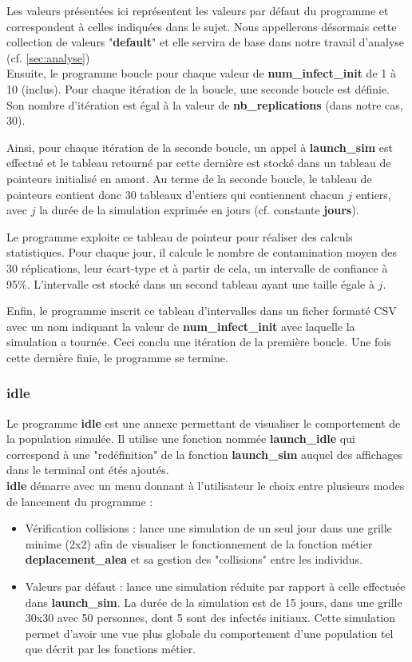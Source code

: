 \documentclass[12pt,french,titlepage]{article}
\begin{document}
Les valeurs présentées ici représentent les valeurs par défaut du programme et correspondent à celles indiquées dans le sujet. Nous appellerons désormais cette collection de valeurs "\textbf{default}" et elle servira de base dans notre travail d'analyse (cf. \ref{sec:analyse})\\

Ensuite, le programme boucle pour chaque valeur de \textbf{num\_infect\_init} de 1 à 10 (inclus). Pour chaque itération de la boucle, une seconde boucle est définie. Son nombre d'itération est égal à la valeur de \textbf{nb\_replications} (dans notre cas, 30). 

Ainsi, pour chaque itération de la seconde boucle, un appel à \textbf{launch\_sim} est effectué et le tableau retourné par cette dernière est stocké dans un tableau de pointeurs initialisé en amont. Au terme de la seconde boucle, le tableau de pointeurs contient donc 30 tableaux d'entiers qui contiennent chacun $j$ entiers, avec $j$ la durée de la simulation exprimée en jours (cf. constante \textbf{jours}).


Le programme exploite ce tableau de pointeur pour réaliser des calculs statistiques. Pour chaque jour, il calcule le nombre de contamination moyen des 30 réplications, leur écart-type et à partir de cela, un intervalle de confiance à 95\%. L'intervalle est stocké dans un second tableau ayant une taille égale à $j$.

Enfin, le programme inscrit ce tableau d'intervalles dans un ficher formaté CSV avec un nom indiquant la valeur de \textbf{num\_infect\_init} avec laquelle la simulation a tournée. Ceci conclu une itération de la première boucle. Une fois cette dernière finie, le programme se termine.

\subsubsection{idle}
Le programme \textbf{idle} est une annexe permettant de visualiser le comportement de la population simulée. Il utilise une fonction nommée \textbf{launch\_idle} qui correspond à une "redéfinition" de la fonction \textbf{launch\_sim} auquel des affichages dans le terminal ont étés ajoutés.\\

\textbf{idle} démarre avec un menu donnant à l'utilisateur le choix entre plusieurs modes de lancement du programme :
\begin{itemize}
\item Vérification collisions : lance une simulation de un seul jour dans une grille minime (2x2) afin de visualiser le fonctionnement de la fonction métier \textbf{deplacement\_alea} et sa gestion des "collisions" entre les individus.

\item Valeurs par défaut : lance une simulation réduite par rapport à celle effectuée dans \textbf{launch\_sim}. La durée de la simulation est de 15 jours, dans une grille 30x30 avec 50 personnes, dont 5 sont des infectés initiaux. Cette simulation permet d'avoir une vue plus globale du comportement d'une population tel que décrit par les fonctions métier.\\
\end{itemize}
\end{document}
